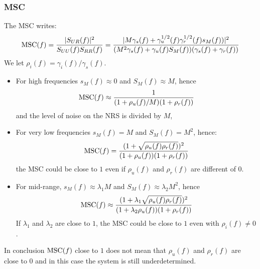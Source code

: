 \subsubsection{MSC}
The MSC writes:
\begin{eqnarray}
\label{eq:RsuponM}
 \mathrm{MSC}(f) = \frac{|S_{UR}(f)|^2}{S_{UU}(f)S_{RR}(f)}
 = \frac{|M\gamma_{s}(f)+\gamma_{u}^{1/2}(f)\gamma_{r}^{1/2}(f)s_M(f))|^2}
    {(M^2 \gamma_{s}(f)+ \gamma_{u}(f) S_M(f))(\gamma_{s}(f)+\gamma_{r}(f))}
\end{eqnarray}
We let $\rho_{i}(f)=\gamma_{i}(f)/\gamma_{s}(f)$.
\begin{itemize}
 \item
For high frequencies $s_M(f)\approx 0$ and $S_M(f)\approx M$, hence 
\begin{eqnarray}
\label{eq:MSCHF}
 \mathrm{MSC}(f) 
 \approx \frac{1}{(1+\rho_{u}(f)/M)(1+\rho_{r}(f))}
\end{eqnarray}
and the level of noise on the NRS is divided by $M$,

 \item
For very low frequencies $s_M(f)= M$ and $S_M(f)= M^2$, hence:
\begin{eqnarray}
\label{eq:MSCBF}
 \mathrm{MSC}(f) = \frac{(1+\sqrt{\rho_{u}(f)\rho_{r}(f)})^{2}}{(1+\rho_{u}(f))(1+\rho_{r}(f))}
\end{eqnarray}
	the MSC could be close to $1$ even if $\rho_{u}(f)$ and $\rho_{r}(f)$ are different of 0.
 \item
For mid-range, $s_M(f)\approx \lambda_1 M$ and $S_M(f)\approx \lambda_2 M^{2}$, hence 
\begin{eqnarray}
\label{eq:MSCMidF}
 \mathrm{MSC}(f) \approx 
    \frac{(1+\lambda_{1}\sqrt{\rho_{u}(f)\rho_{r}(f)})^{2}}
           {(1+\lambda_{2} \rho_{u}(f))(1+\rho_{r}(f))}
\end{eqnarray}
If $\lambda_{1}$ and $\lambda_{2}$ are close to $1$, the MSC could be close to $1$ even with $\rho_{i}(f)\neq 0$.
\end{itemize}
In conclusion $\mathrm{MSC}(f)$ close to $1$ does not mean that  $\rho_{u}(f)$ and $\rho_{r}(f)$ are close to 0 and in this case the system is still underdetermined.



